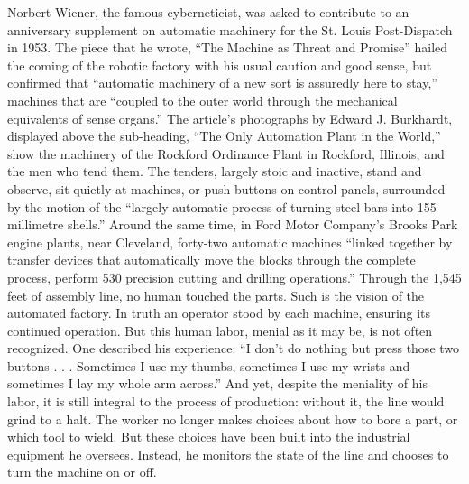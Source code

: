 Norbert Wiener, the famous cyberneticist, was asked to contribute to an
anniversary supplement on automatic machinery for the St. Louis
Post-Dispatch in 1953. The piece that he wrote, ``The Machine as Threat
and Promise''\cite{wienerMachineThreat} hailed the coming of the
robotic factory with his usual 
caution and good sense, but confirmed that ``automatic machinery of a
new sort is assuredly here to stay,'' machines that are ``coupled to the
outer world through the mechanical equivalents of sense organs.'' The
article's photographs by Edward J. Burkhardt, displayed above the
sub-heading, ``The Only Automation Plant in the World,'' show the
machinery of the Rockford Ordinance Plant in Rockford, Illinois, and
the men who tend them. The tenders, largely stoic and inactive, stand
and observe, sit quietly at machines, or push buttons on control
panels, surrounded by the motion of the ``largely automatic process of
turning steel bars into 155 millimetre
shells.''\cite{wienerMachineThreat} Around the same time, in Ford
Motor Company's Brooks Park engine plants, near Cleveland, forty-two
automatic machines ``linked together by transfer devices that
automatically move the blocks through the complete process, perform
530 precision cutting and drilling operations.''\cite[p.
  9]{dieboldImpact} Through the 1,545 feet of assembly line, no human
touched the parts. Such is the vision of the automated factory. In
truth an operator stood by each machine, ensuring its continued
operation. But this human labor, menial as it may be, is not often
recognized. One described his experience: ``I don't do nothing but
press those two buttons . . . Sometimes I use my thumbs, sometimes I
use my wrists and sometimes I lay my whole arm across.''\cite[p.
  10]{dieboldImpact} And yet,
despite the meniality of his labor, it is still integral to the
process of production: without it, the line would grind to a halt. The worker
no longer makes choices about how to bore a part, or which tool to
wield. But these choices have been built into the industrial equipment
he oversees. Instead, he monitors the state of the line and chooses to
turn the machine on or off.

